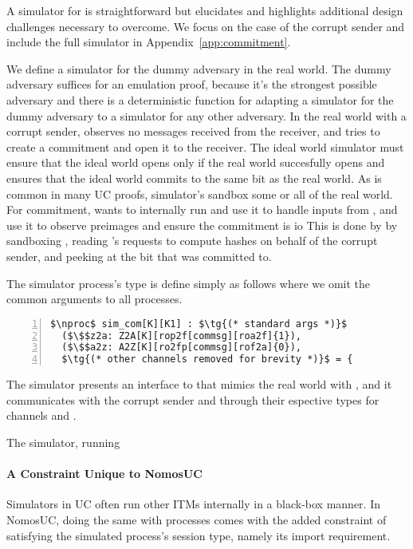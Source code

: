 A simulator for \protcom is straightforward but elucidates and highlights additional design challenges necessary to overcome.
We focus on the case of the corrupt sender and include the full simulator in Appendix~\ref{app:commitment}.

We define a simulator for the dummy adversary in the real world.
The dummy adversary suffices for an emulation proof, because it's the strongest possible adversary and there is a deterministic function for adapting a simulator for the dummy adversary to a simulator for any other adversary.
In the real world with a corrupt sender, \Z observes no messages received from the receiver, and tries to create a commitment and open it to the receiver.
The ideal world simulator \Sim must ensure that the ideal world opens only if the real world succesfully opens and ensures that the ideal world commits to the same bit as the real world.
As is common in many UC proofs, simulator's sandbox some or all of the real world.
For commitment, \Sim wants to internally run \Fro and use it to handle inputs from \Z, and use it to observe preimages and ensure the commitment is io
This is done by \Sim by sandboxing \Fro, reading \Z's requests to compute hashes on behalf of the corrupt sender, and peeking at the bit that was committed to.

The simulator process's type is define simply as follows where we omit the common arguments to all processes. 
\begin{lstlisting}[basicstyle=\scriptsize\BeraMonottFamily, mathescape, frame=single, numbers=left, xleftmargin=2em, xrightmargin=0em]
$\nproc$ sim_com[K][K1] : $\tg{(* standard args *)}$ 
  ($\$$z2a: Z2A[K][rop2f[commsg][roa2f]{1}), 
  ($\$$a2z: A2Z[K][ro2fp[commsg][rof2a]{0}),
  $\tg{(* other channels removed for brevity *)}$ = {
\end{lstlisting}
The simulator presents an interface to \Z that mimics the real world with \Fro, and it communicates with the corrupt sender and \Fcom through their espective types for channels  and .

The simulator, running 

\paragraph*{\textbf{A Constraint Unique to NomosUC}}
Simulators in UC often run other ITMs internally in a black-box manner. 
In NomosUC, doing the same with processes comes with the added constraint of satisfying the simulated process's session type, namely its import requirement.

